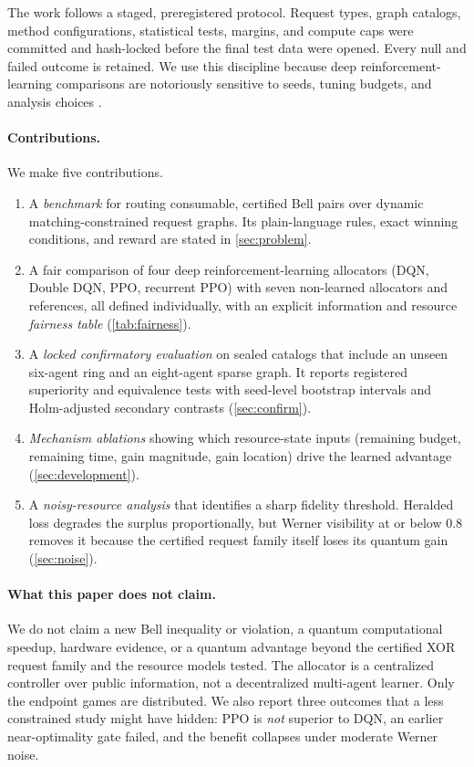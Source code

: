 \documentclass[11pt,a4paper]{article}
\begin{document}
The work follows a staged, preregistered protocol. Request types, graph catalogs, method configurations, statistical tests, margins, and compute caps were committed and hash-locked before the final test data were opened. Every null and failed outcome is retained. We use this discipline because deep reinforcement-learning comparisons are notoriously sensitive to seeds, tuning budgets, and analysis choices \cite{henderson2018deep,agarwal2021deep}.

\paragraph{Contributions.} We make five contributions.
\begin{enumerate}[leftmargin=*]
  \item A \emph{benchmark} for routing consumable, certified Bell pairs over dynamic matching-constrained request graphs. Its plain-language rules, exact winning conditions, and reward are stated in \cref{sec:problem}.
  \item A fair comparison of four deep reinforcement-learning allocators (DQN, Double DQN, PPO, recurrent PPO) with seven non-learned allocators and references, all defined individually, with an explicit information and resource \emph{fairness table} (\cref{tab:fairness}).
  \item A \emph{locked confirmatory evaluation} on sealed catalogs that include an unseen six-agent ring and an eight-agent sparse graph. It reports registered superiority and equivalence tests with seed-level bootstrap intervals and Holm-adjusted secondary contrasts (\cref{sec:confirm}).
  \item \emph{Mechanism ablations} showing which resource-state inputs (remaining budget, remaining time, gain magnitude, gain location) drive the learned advantage (\cref{sec:development}).
  \item A \emph{noisy-resource analysis} that identifies a sharp fidelity threshold. Heralded loss degrades the surplus proportionally, but Werner visibility at or below $0.8$ removes it because the certified request family itself loses its quantum gain (\cref{sec:noise}).
\end{enumerate}

\paragraph{What this paper does not claim.} We do not claim a new Bell inequality or violation, a quantum computational speedup, hardware evidence, or a quantum advantage beyond the certified XOR request family and the resource models tested. The allocator is a centralized controller over public information, not a decentralized multi-agent learner. Only the endpoint games are distributed. We also report three outcomes that a less constrained study might have hidden: PPO is \emph{not} superior to DQN, an earlier near-optimality gate failed, and the benefit collapses under moderate Werner noise.
\end{document}
